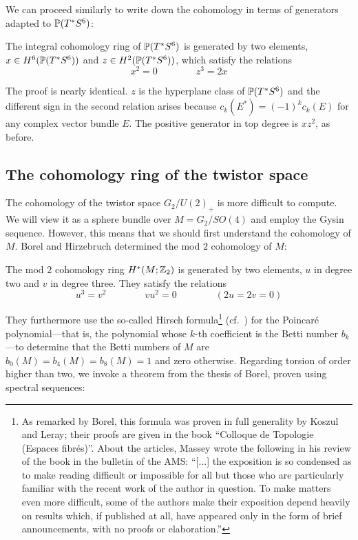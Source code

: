We can proceed similarly to write down the cohomology in terms of generators adapted to $\P(T^*S^6)$:

\begin{prop}\label{prop:cohomofPT*S6}
	The integral cohomology ring of $\P(T^*S^6)$ is generated by two elements, $x\in H^6(\P(T^*S^6))$ and $z\in H^2(\P(T^*S^6))$, which satisfy the relations
	\begin{equation*}
		x^2=0 \qquad \qquad z^3=2x
	\end{equation*}
\end{prop}
\begin{myproof}
	The proof is nearly identical. $z$ is the hyperplane class of $\P(T^*S^6)$ and the different sign in the second relation arises because $c_k(E^*)=(-1)^kc_k(E)$ for any complex vector bundle $E$. The positive generator in top degree is $xz^2$, as before. 
\end{myproof}

\subsection{The cohomology ring of the twistor space}

The cohomology of the twistor space $G_2/U(2)_+$ is more difficult to compute. We will view it as a sphere bundle over $M=G_2/SO(4)$ and employ the Gysin sequence. However, this means that we should first understand the cohomology of $M$. Borel and Hirzebruch determined the mod $2$ cohomology of $M$:

\begin{prop}[{\cite[\S 17.3]{BH1958a}}]
	The mod $2$ cohomology ring $H^*(M;\Z_2)$ is generated by two elements, $u$ in degree two and $v$ in degree three. They satisfy the relations 
	\begin{equation*}
		u^3=v^2 \qquad \qquad vu^2=0 \qquad \qquad (2u=2v=0)
	\end{equation*}
\end{prop}

They furthermore use the so-called Hirsch formula\footnote{
	As remarked by Borel, this formula was proven in full generality by Koszul and Leray; their proofs are given in the book ``Colloque de Topologie (Espaces fibr\'es)''. About the articles, Massey wrote the following in his review of the book in the bulletin of the AMS: ``[...] the exposition is so condensed as to make reading difficult or impossible for all but those who are particularly familiar with the recent work of the author in question. To make matters even more difficult, some of the authors make their exposition depend heavily on results which, if published at all, have appeared only in the form of brief announcements, with no proofs or elaboration.''
}
(cf.~\cite[192]{Bor1953}) for the Poincar\'{e} polynomial---that is, the polynomial whose $k$-th coefficient is the Betti number $b_k$---to determine that the Betti numbers of $M$ are $b_0(M)=b_4(M)=b_8(M)=1$ and zero otherwise. Regarding torsion of order higher than two, we invoke a theorem from the thesis of Borel, proven using spectral sequences:

